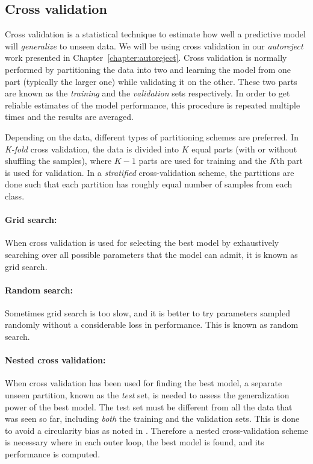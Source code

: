 \subsection{Cross validation}

Cross validation is a statistical technique to estimate how well a predictive model will \emph{generalize} to unseen data. We will be using cross validation in our \emph{autoreject} work presented in Chapter~\ref{chapter:autoreject}. Cross validation is normally performed by partitioning the data into two and learning the model from one part (typically the larger one) while validating it on the other. These two parts are known as the \emph{training} and the \emph{validation} sets respectively. In order to get reliable estimates of the model performance, this procedure is repeated multiple times and the results are averaged.

Depending on the data, different types of partitioning schemes are preferred. In \emph{K-fold} cross validation, the data is divided into $K$ equal parts (with or without shuffling the samples), where $K - 1$ parts are used for training and the $K$th part is used for validation. In a \emph{stratified} cross-validation scheme, the partitions are done such that each partition has roughly equal number of samples from each class.

\paragraph{Grid search: } When cross validation is used for selecting the best model by exhaustively searching over all possible parameters that the model can admit, it is known as grid search.

\paragraph{Random search: } Sometimes grid search is too slow, and it is better to try parameters sampled randomly without a considerable loss in performance. This is known as random search.

\paragraph{Nested cross validation: } When cross validation has been used for finding the best model, a separate unseen partition, known as the \emph{test} set, is needed to assess the generalization power of the best model. The test set must be different from all the data that was seen so far, including \emph{both} the training and the validation sets. This is done to avoid a circularity bias as noted in \cite{varoquaux2017assessing}. Therefore a nested cross-validation scheme is necessary where in each outer loop, the best model is found, and its performance is computed.

